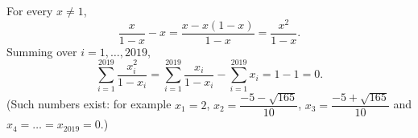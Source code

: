 For every $x\ne1$,
\[
\dfrac{x}{1-x}-x=\dfrac{x-x(1-x)}{1-x}=\dfrac{x^2}{1-x}.
\]
Summing over $i=1,\dots,2019$,
\[
\sum_{i=1}^{2019}\dfrac{x_i^2}{1-x_i}=\sum_{i=1}^{2019}\dfrac{x_i}{1-x_i}-\sum_{i=1}^{2019}x_i=1-1=\boxed{0}.
\]
(Such numbers exist: for example $x_1=2$, $x_2=\dfrac{-5-\sqrt{165}}{10}$, $x_3=\dfrac{-5+\sqrt{165}}{10}$ and $x_4=\dots=x_{2019}=0$.)
